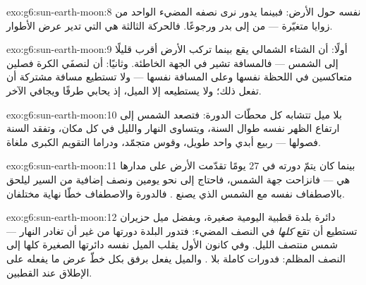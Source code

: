 \begin{solution}{exo:g6:sun-earth-moon:8}
  نفسه حول الأرض: فبينما يدور نرى نصفه المضيء الواحد
من زوايا متغيّرة --- من  إلى بدر ورجوعًا. فالحركة الثالثة
هي التي تدير عرض الأطوار.
\end{solution}

\begin{solution}{exo:g6:sun-earth-moon:9}
أولًا: أن الشتاء الشمالي يقع بينما تركب الأرض أقرب قليلًا إلى
الشمس --- فالمسافة تشير في الجهة الخاطئة. وثانيًا: أن لنصفَي
الكرة فصلين متعاكسين في اللحظة نفسها وعلى المسافة نفسها ---
ولا تستطيع مسافة مشتركة أن تفعل ذلك؛ ولا يستطيعه إلا الميل،
إذ يحابي طرفًا ويجافي الآخر.
\end{solution}

\begin{solution}{exo:g6:sun-earth-moon:10}
بلا ميل تتشابه كل محطّات الدورة: فتصعد الشمس إلى ارتفاع الظهر
نفسه طوال السنة، ويتساوى النهار والليل في كل مكان، وتفقد السنة
فصولها --- ربيع أبدي واحد طويل، وقوس  متجمّد، ودراما
التقويم الكبرى ملغاة.
\end{solution}

\begin{solution}{exo:g6:sun-earth-moon:11}
بينما كان  يتمّ دورته في $27$ يومًا تقدّمت الأرض على
مدارها هي --- فانزاحت جهة الشمس، فاحتاج  إلى نحو يومين
ونصف إضافية من السير ليلحق بالاصطفاف نفسه مع الشمس الذي يصنع
. فالدورة والاصطفاف خطّا نهاية مختلفان.
\end{solution}

\begin{solution}{exo:g6:sun-earth-moon:12}
دائرة بلدة قطبية اليومية صغيرة، وبفضل ميل حزيران تستطيع أن تقع
\emph{كلها} في النصف المضيء: فتدور البلدة دورتها من غير أن
تغادر  النهار --- شمس منتصف الليل. وفي كانون الأول يقلب
الميل نفسه دائرتها الصغيرة كلها إلى النصف المظلم: فدورات كاملة
بلا . والميل يفعل برفق بكل خطّ عرض ما يفعله على الإطلاق عند
القطبين.
\end{solution}

